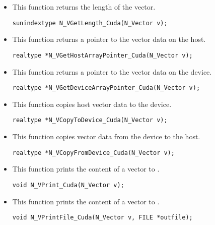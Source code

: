 \begin{itemize}


\item {}
 
 This function returns the length of the vector.

 \verb|sunindextype N_VGetLength_Cuda(N_Vector v);|


\item {}
 
 This function returns a pointer to the vector data on the host.

 \verb|realtype *N_VGetHostArrayPointer_Cuda(N_Vector v);|



\item {}
 
 This function returns a pointer to the vector data on the device.

 \verb|realtype *N_VGetDeviceArrayPointer_Cuda(N_Vector v);|



\item {}
 
 This function copies host vector data to the device.

 \verb|realtype *N_VCopyToDevice_Cuda(N_Vector v);|



\item {}
 
 This function copies vector data from the device to the host.

 \verb|realtype *N_VCopyFromDevice_Cuda(N_Vector v);|



\item {}
  
  This function prints the content of a {\cuda} vector to . 
    
  \verb|void N_VPrint_Cuda(N_Vector v);|


\item {}
  
  This function prints the content of a {\cuda} vector to . 
    
  \verb|void N_VPrintFile_Cuda(N_Vector v, FILE *outfile);|


\end{itemize}
